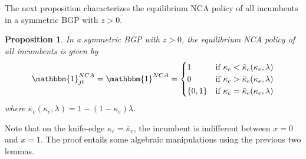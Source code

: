 \documentclass[11pt,english]{article}
\newtheorem{proposition}{Proposition}
\begin{document}
The next proposition characterizes the equilibrium NCA policy of all incumbents in a symmetric BGP with $z > 0$. 

\begin{proposition}\label{proposition:optimalNCApolicy}
	In a symmetric BGP with $z > 0$, the equilibrium NCA policy of all incumbents is given by 
	\begin{align}
	\mathbbm{1}^{NCA}_{jt} = \mathbbm{1}^{NCA} = \begin{cases}
	1 & \textrm{if } \kappa_{c} < \bar{\kappa}_c (\kappa_e, \lambda) \\
	0 & \textrm{if } \kappa_{c} > \bar{\kappa}_c (\kappa_e, \lambda)\\
	\{0,1\} & \textrm{if } \kappa_c = \bar{\kappa}_c (\kappa_e, \lambda) 
	\end{cases} \label{eq_nca_policy}
	\end{align}
	where $\bar{\kappa}_c (\kappa_e, \lambda) = 1 - (1-\kappa_e)\lambda$.

\end{proposition}

Note that on the knife-edge $\kappa_c = \bar{\kappa}_c$, the incumbent is indifferent between $x = 0$ and $x = 1$. The proof entails some algebraic manipulations using the previous two lemmas. 
\end{document}
